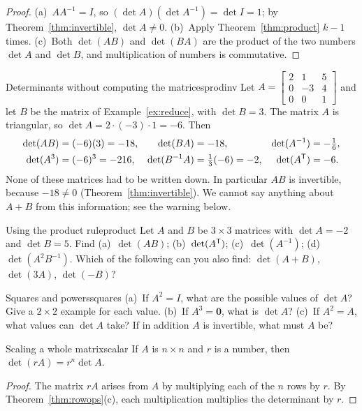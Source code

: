 \documentclass[11pt]{article}
\begin{document}
\begin{proof}
(a)~$AA^{-1}=I$, so $(\det A)(\det A^{-1})=\det I=1$; by Theorem~\ref{thm:invertible}, $\det A\neq0$. (b)~Apply Theorem~\ref{thm:product} $k-1$ times. (c)~Both $\det(AB)$ and $\det(BA)$ are the product of the two numbers $\det A$ and $\det B$, and multiplication of numbers is commutative.
\end{proof}

\begin{exmp}{Determinants without computing the matrices}{prodinv}
Let $A=\begin{bmatrix}2&1&5\\0&-3&4\\0&0&1\end{bmatrix}$ and let $B$ be the matrix of Example~\ref{ex:reduce}, with $\det B=3$. The matrix $A$ is triangular, so $\det A=2\cdot(-3)\cdot1=-6$. Then
\begin{align*}
\det(AB)&=(-6)(3)=-18, & \det(BA)&=-18, & \det(A^{-1})&=-\tfrac16,\\
\det(A^3)&=(-6)^3=-216, & \det(B^{-1}A)&=\tfrac13(-6)=-2, & \det(A^{\mathsf T})&=-6.
\end{align*}
None of these matrices had to be written down. In particular $AB$ is invertible, because $-18\neq0$ (Theorem~\ref{thm:invertible}). We cannot say anything about $A+B$ from this information; see the warning below.
\end{exmp}

\begin{kc}{Using the product rule}{product}
Let $A$ and $B$ be $3\times3$ matrices with $\det A=-2$ and $\det B=5$. Find (a)~$\det(AB)$; (b)~$\det(A^{\mathsf T})$; (c)~$\det(A^{-1})$; (d)~$\det(A^2B^{-1})$. Which of the following can you also find: $\det(A+B)$, $\det(3A)$, $\det(-B)$?
\end{kc}

\begin{think}{Squares and powers}{squares}
(a)~If $A^2=I$, what are the possible values of $\det A$? Give a $2\times2$ example for each value. (b)~If $A^3=\mathbf{0}$, what is $\det A$? (c)~If $A^2=A$, what values can $\det A$ take? If in addition $A$ is invertible, what must $A$ be?
\end{think}

\begin{thm}{Scaling a whole matrix}{scalar}
If $A$ is $n\times n$ and $r$ is a number, then $\det(rA)=r^n\det A$.
\end{thm}

\begin{proof}
The matrix $rA$ arises from $A$ by multiplying each of the $n$ rows by $r$. By Theorem~\ref{thm:rowops}(c), each multiplication multiplies the determinant by $r$.
\end{proof}
\end{document}

